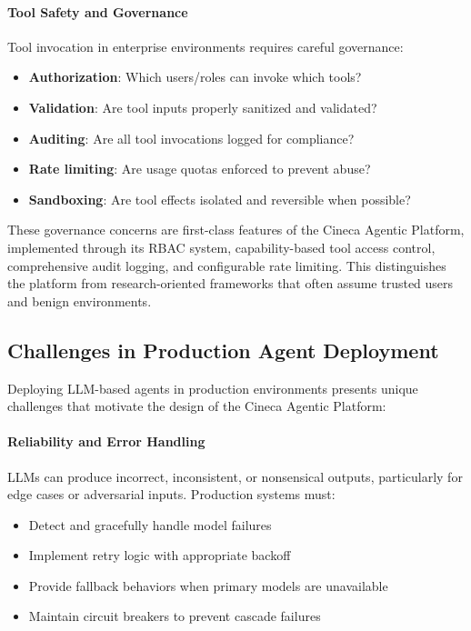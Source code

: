 \documentclass[a4paper,twoside]{sapthesis}
\begin{document}
\paragraph{Tool Safety and Governance}
Tool invocation in enterprise environments requires careful governance:
\begin{itemize}
    \item \textbf{Authorization}: Which users/roles can invoke which tools?
    \item \textbf{Validation}: Are tool inputs properly sanitized and validated?
    \item \textbf{Auditing}: Are all tool invocations logged for compliance?
    \item \textbf{Rate limiting}: Are usage quotas enforced to prevent abuse?
    \item \textbf{Sandboxing}: Are tool effects isolated and reversible when possible?
\end{itemize}

These governance concerns are first-class features of the Cineca Agentic Platform, implemented through its RBAC system, capability-based tool access control, comprehensive audit logging, and configurable rate limiting. This distinguishes the platform from research-oriented frameworks that often assume trusted users and benign environments.

\subsection{Challenges in Production Agent Deployment}

Deploying LLM-based agents in production environments presents unique challenges that motivate the design of the Cineca Agentic Platform:

\paragraph{Reliability and Error Handling}
LLMs can produce incorrect, inconsistent, or nonsensical outputs, particularly for edge cases or adversarial inputs. Production systems must:
\begin{itemize}
    \item Detect and gracefully handle model failures
    \item Implement retry logic with appropriate backoff
    \item Provide fallback behaviors when primary models are unavailable
    \item Maintain circuit breakers to prevent cascade failures
\end{itemize}
\end{document}
